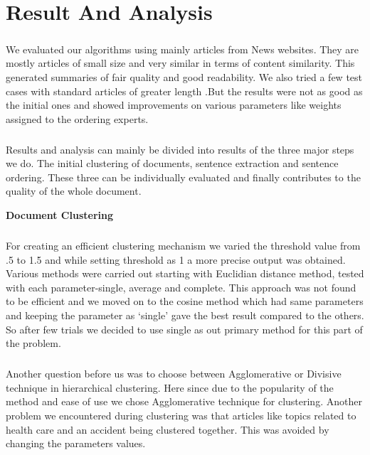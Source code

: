 \chapter{Result And Analysis}
\paragraph{}	We evaluated our algorithms using mainly articles from News websites. They are mostly articles of small size and very similar in terms of content similarity. This generated summaries of fair quality and good readability. We also tried a few test cases with standard articles of greater length .But the results were not as good as the initial ones and showed improvements on various parameters like weights assigned to the ordering experts.
\paragraph{}	Results and analysis can mainly be divided into results of the three major steps we do. The initial clustering of documents, sentence extraction and sentence ordering. These three can be individually evaluated and finally contributes to the quality of the whole document.


\textbf{Document Clustering}
\paragraph{}	For creating an efficient clustering mechanism we varied the threshold value from .5 to 1.5 and while setting threshold as 1 a more precise output was obtained. Various methods were carried out starting with Euclidian distance method, tested with each parameter-single, average and complete. This approach was not found to be efficient and we moved on to the cosine method which had same parameters and keeping the parameter as ‘single’ gave the best result compared to the others. So after few trials we decided to use single as out primary method for this part of the problem.
\paragraph{}	Another question before us was to choose between Agglomerative or Divisive technique in hierarchical clustering. Here since due to the popularity of the method and ease of use we chose Agglomerative technique for clustering. Another problem we encountered during clustering was that articles like topics related to health care and an accident being clustered together. This was avoided by changing the parameters values.


